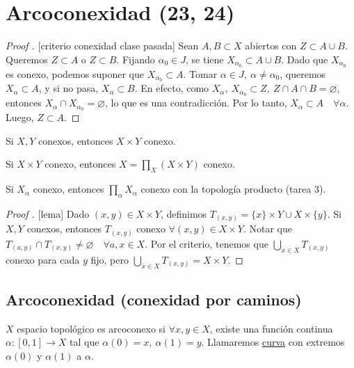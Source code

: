 \section{Arcoconexidad (23, 24)}

\begin{proof}[Proof ][criterio conexidad clase pasada]
	Sean $A,B \subset X$ abiertos con $Z \subset A \cup B$. Queremos $Z \subset A$ o $Z \subset B$. Fijando $\alpha_{0} \in J$, se tiene $X_{\alpha_{0}} \subset A \cup B$. Dado que $X_{\alpha_{0}}$ es conexo, podemos suponer que $X_{\alpha_{0}} \subset A$. Tomar $\alpha \in J,\ \alpha \neq \alpha_{0}$, queremos $X_{\alpha} \subset A$, y si no pasa, $X_{\alpha} \subset B$. En efecto, como $X_{\alpha},\ X_{\alpha_{0}} \subset Z,\ Z \cap A \cap B = \varnothing$, entonces $X_{\alpha} \cap X_{\alpha_{0}} = \varnothing$, lo que es una contradicción. Por lo tanto, $X_{\alpha} \subset A \quad \forall \alpha$. Luego, $Z \subset A$.
\end{proof}

\begin{lemma}
	Si $X,Y$ conexos, entonces $X \times Y$ conexo.
\end{lemma}

\begin{observe}
	Si $X \times Y$ conexo, entonces $X = \prod_{X} (X \times Y)$ conexo.
\end{observe}

\begin{observe}
	Si $X_{\alpha}$ conexo, entonces $\prod_{\alpha} X_{\alpha}$ conexo con la topología producto (tarea 3).
\end{observe}

\begin{proof}[Proof ][lema]
	Dado $(x,y) \in X \times Y$, definimos $T_{(x,y)} = \{x\} \times Y \cup X \times \{y\}$. Si $X,Y$ conexos, entonces $T_{(x,y)}$ conexo $\forall (x,y) \in X \times Y$. Notar que $T_{(a,y)} \cap T_{(x,y)} \neq \varnothing \quad \forall a,x \in X$. Por el criterio, tenemos que $\bigcup_{x\in X} T_{(x,y)}$ conexo para cada $y$ fijo, pero $\bigcup_{x \in X} T_{(x,y)} = X \times Y$.
\end{proof}

\subsection{Arcoconexidad (conexidad por caminos)}

\begin{definition}[curva]
	$X$ espacio topológico es arcoconexo si $\forall x,y \in X$, existe una función continua $\alpha : [0,1] \to X$ tal que $\alpha(0) = x,\ \alpha(1) = y$. Llamaremos \underline{curva} con extremos $\alpha(0)$ y $\alpha(1)$ a $\alpha$.
\end{definition}


